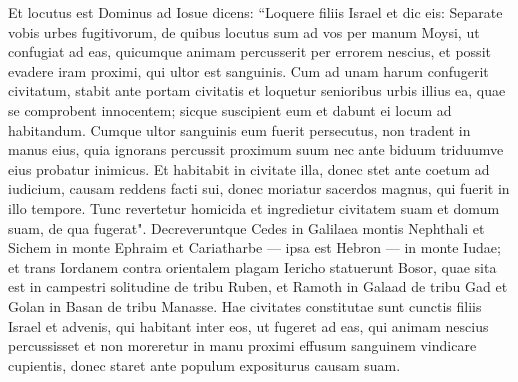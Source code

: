 \begin{biblechapter}  
\verse Et locutus est Dominus ad Iosue dicens: “Loquere filiis Israel et dic eis: 
\verse Separate vobis urbes fugitivorum, de quibus locutus sum ad vos per manum Moysi, 
\verse ut confugiat ad eas, quicumque animam percusserit per errorem nescius, et possit evadere iram proximi, qui ultor est sanguinis. 
\verse Cum ad unam harum confugerit civitatum, stabit ante portam civitatis et loquetur senioribus urbis illius ea, quae se comprobent innocentem; sicque suscipient eum et dabunt ei locum ad habitandum. 
\verse Cumque ultor sanguinis eum fuerit persecutus, non tradent in manus eius, quia ignorans percussit proximum suum nec ante biduum triduumve eius probatur inimicus. 
\verse Et habitabit in civitate illa, donec stet ante coetum ad iudicium, causam reddens facti sui, donec moriatur sacerdos magnus, qui fuerit in illo tempore. Tunc revertetur homicida et ingredietur civitatem suam et domum suam, de qua fugerat". 
\verse Decreveruntque Cedes in Galilaea montis Nephthali et Sichem in monte Ephraim et Cariatharbe — ipsa est Hebron — in monte Iudae; 
\verse et trans Iordanem contra orientalem plagam Iericho statuerunt Bosor, quae sita est in campestri solitudine de tribu Ruben, et Ramoth in Galaad de tribu Gad et Golan in Basan de tribu Manasse. 
\verse Hae civitates constitutae sunt cunctis filiis Israel et advenis, qui habitant inter eos, ut fugeret ad eas, qui animam nescius percussisset et non moreretur in manu proximi effusum sanguinem vindicare cupientis, donec staret ante populum expositurus causam suam. 
\end{biblechapter}

